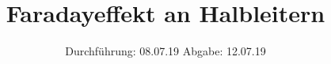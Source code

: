 

\subject{V46}
\title{Faradayeffekt an Halbleitern}
\date{
  Durchführung: 08.07.19
  \hspace{3em}
  Abgabe: 12.07.19
}



\maketitle
\thispagestyle{empty}
\tableofcontents
\newpage




%


%
\newpage
\printbibliography


